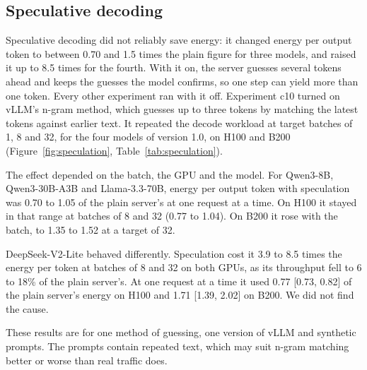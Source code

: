 \documentclass[11pt]{article}
\begin{document}
\subsection{Speculative decoding}\label{sec:speculation}

Speculative decoding did not reliably save energy: it changed energy per output token to between 0.70 and 1.5 times the plain figure for three models, and raised it up to 8.5 times for the fourth. With it on, the server guesses several tokens ahead and keeps the guesses the model confirms, so one step can yield more than one token. Every other experiment ran with it off. Experiment c10 turned on vLLM's n-gram method, which guesses up to three tokens by matching the latest tokens against earlier text. It repeated the decode workload at target batches of 1, 8 and 32, for the four models of version 1.0, on H100 and B200 (Figure~\ref{fig:speculation}, Table~\ref{tab:speculation}).

The effect depended on the batch, the GPU and the model. For Qwen3-8B, Qwen3-30B-A3B and Llama-3.3-70B, energy per output token with speculation was 0.70 to 1.05 of the plain server's at one request at a time. On H100 it stayed in that range at batches of 8 and 32 (0.77 to 1.04). On B200 it rose with the batch, to 1.35 to 1.52 at a target of 32.

DeepSeek-V2-Lite behaved differently. Speculation cost it 3.9 to 8.5 times the energy per token at batches of 8 and 32 on both GPUs, as its throughput fell to 6 to 18\% of the plain server's. At one request at a time it used 0.77 [0.73, 0.82] of the plain server's energy on H100 and 1.71 [1.39, 2.02] on B200. We did not find the cause.

These results are for one method of guessing, one version of vLLM and synthetic prompts. The prompts contain repeated text, which may suit n-gram matching better or worse than real traffic does.
\end{document}
